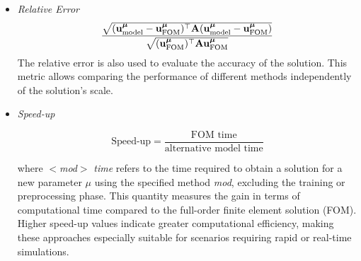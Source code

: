 \documentclass[
    conference,
    nofonttune,
    11pt
]{IEEEtran}
\begin{document}
\begin{itemize}
                In discrete form, the total error is computed as:
                \begin{equation*}
                    \resizebox{.9\columnwidth}{!}{$
                        \sqrt{
                            (\mBF u^\boldmu_{\text{FOM}}-\mBF u^\boldmu_{\text{PINN}})^\top
                            \mBF A
                            (\mBF u^\boldmu_{\text{FOM}}-\mBF u^\boldmu_{\text{PINN}})
                            +
                            (\mBF A_{\text{strong}}\mBF R)^\top\mBF A(\mBF A_{\text{strong}}\mBF R)
                        }
                    $}
                \end{equation*}
                where $\mBF R$ is the residual vector of the PDE evaluated at test points, generally different from the FEM nodes, and $\mBF A_{\text{strong}}$ is an operator (matrix) that projects the residual onto the FEM space, so that the norm can be computed in the same space for each contribution. This type of error reflects not only the difference between the predicted and reference solution, but also how well the neural network satisfies the physics imposed by the differential equation. It is therefore a more coherent metric for evaluating PINN-based models.
                
                \item{\textit{Relative Error}}
                  $$
                    \frac{\sqrt{({\mathbf u}^{\boldsymbol\mu}_{\text{model}}-{\mathbf u}^{\boldsymbol\mu}_{\text{FOM}})^\top
                        {\mathbf A} ({\mathbf u}^{\boldsymbol\mu}_{\text{model}}-{\mathbf u}^{\boldsymbol\mu}_{\text{FOM}})}}
                        {\sqrt{({\mathbf u}_{\text{FOM}}^{\boldsymbol\mu})^\top{\mathbf A}{\mathbf u}^{\boldsymbol\mu}_{\text{FOM}}}}
                  $$
                  The relative error is also used to evaluate the accuracy of the solution. This metric allows comparing the performance of different methods independently of the solution's scale.
                
                \item{\textit{Speed-up}}
                  
                    $$
                    \text{Speed-up} = \frac{\text{FOM time}}{\text{alternative model time}}
                    $$
                  
                    where $<$\textit{mod}$>$ \textit{time} refers to the time required to obtain a solution for a new parameter $\mu$ using the specified method \textit{mod}, excluding the training or preprocessing phase. This quantity measures the gain in terms of computational time compared to the full-order finite element solution (FOM). Higher speed-up values indicate greater computational efficiency, making these approaches especially suitable for scenarios requiring rapid or real-time simulations.
                \end{itemize}
                
\end{document}
